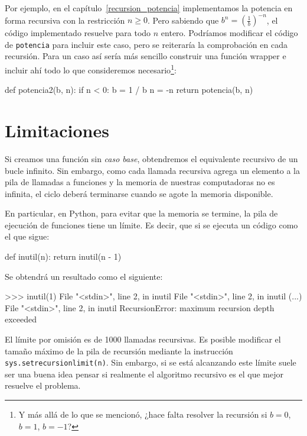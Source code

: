 Por ejemplo, en el capítulo~\ref{recursion_potencia} implementamos la potencia
en forma recursiva con la restricción $n \geq 0$. Pero sabiendo que
$b^n = \left(\frac1b\right)^{-n}$, el código implementado resuelve para todo
$n$ entero. Podríamos modificar el código de \lstinline!potencia! para
incluir este caso, pero se reiteraría la comprobación en cada recursión.
Para un caso así sería más sencillo construir una función wrapper
e incluir ahí todo lo que consideremos necesario\footnote{Y más allá de lo
que se mencionó, ¿hace falta resolver la recursión si $b=0$, $b=1$, $b=-1$?}:
\begin{codigo-python-sn}
def potencia2(b, n):
   if n < 0:
      b = 1 / b
      n = -n
   return potencia(b, n)
\end{codigo-python-sn}

\section{Limitaciones}

Si creamos una función sin \emph{caso base}, obtendremos el equivalente
recursivo de un bucle infinito.  Sin embargo, como cada llamada recursiva
agrega un elemento a la pila de llamadas a funciones y la memoria de
nuestras computadoras no es infinita, el ciclo deberá terminarse cuando se
agote la memoria disponible.

En particular, en Python, para evitar que la memoria se termine, la pila de
ejecución de funciones tiene un límite. Es decir, que si se ejecuta un
código como el que sigue:

\begin{codigo-python-sn}
def inutil(n):
    return inutil(n - 1)
\end{codigo-python-sn}

Se obtendrá un resultado como el siguiente:

\begin{codigo-python-sn}
>>> inutil(1)
  File "<stdin>", line 2, in inutil
  File "<stdin>", line 2, in inutil
  (...)
  File "<stdin>", line 2, in inutil
RecursionError: maximum recursion depth exceeded
\end{codigo-python-sn}

El límite por omisión es de 1000 llamadas recursivas. Es posible modificar
el tamaño máximo de la pila de recursión mediante la instrucción
\lstinline!sys.setrecursionlimit(n)!.  Sin embargo, si se está alcanzando
este límite suele ser una buena idea pensar si realmente el algoritmo
recursivo es el que mejor resuelve el problema.

